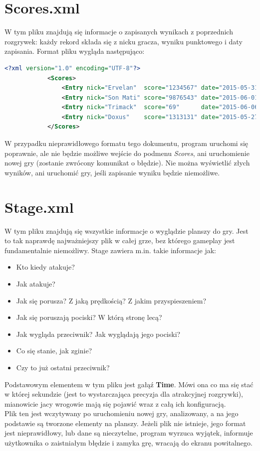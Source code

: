 	\section{Scores.xml}
		W tym pliku znajdują się informacje o zapisanych wynikach z poprzednich rozgrywek: każdy rekord składa się z nicku gracza, wyniku punktowego i daty zapisania. Format pliku wygląda następująco:
		\begin{lstlisting}[language=xml]
			<?xml version="1.0" encoding="UTF-8"?>
			<Scores>
				<Entry nick="Ervelan"  score="1234567" date="2015-05-31"/>
				<Entry nick="Son Mati" score="9876543" date="2015-06-01"/>
				<Entry nick="Trimack"  score="69"      date="2015-06-06"/>
				<Entry nick="Doxus"    score="1313131" date="2015-05-27"/>
			</Scores>
		\end{lstlisting}
		W przypadku nieprawidłowego formatu tego dokumentu, program uruchomi się poprawnie, ale nie będzie możliwe wejście do podmenu \emph{Scores}, ani uruchomienie nowej gry (zostanie zwrócony komunikat o błędzie). Nie można wyświetlić złych wyników, ani uruchomić gry, jeśli zapisanie wyniku będzie niemożliwe.
	\newpage
	\section{Stage.xml}
		W tym pliku znajdują się wszystkie informacje o wyglądzie planszy do gry. Jest to tak naprawdę najważniejszy plik w całej grze, bez którego gameplay jest fundamentalnie niemożliwy. Stage zawiera m.in. takie informacje jak:
		\begin{itemize}
			\item Kto kiedy atakuje?
			\item Jak atakuje?
			\item Jak się porusza? Z jaką prędkością? Z jakim przyspieszeniem?
			\item Jak się poruszają pociski? W którą stronę lecą?
			\item Jak wygląda przeciwnik? Jak wyglądają jego pociski?
			\item Co się stanie, jak zginie?
			\item Czy to już ostatni przeciwnik?
		\end{itemize}
		Podstawowym elementem w tym pliku jest gałąź \textbf{Time}. Mówi ona co ma się stać w której sekundzie (jest to wystarczająca precyzja dla atrakcyjnej rozgrywki), mianowicie jacy wrogowie mają się pojawić wraz z całą ich konfiguracją.\\Plik ten jest wczytywany po uruchomieniu nowej gry, analizowany, a na jego podstawie są tworzone elementy na planszy. Jeżeli plik nie istnieje, jego format jest nieprawidłowy, lub dane są nieczytelne, program wyrzuca wyjątek, informuje użytkownika o zaistniałym błędzie i zamyka grę, wracają do ekranu powitalnego.
		\newpage
